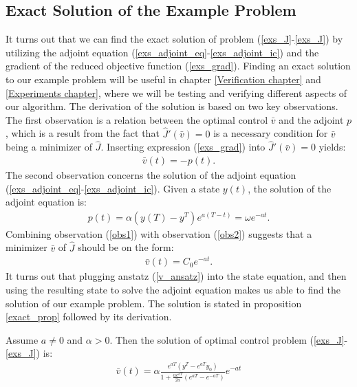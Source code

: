 \subsection{Exact Solution of the Example Problem} \label{exact_sec}
It turns out that we can find the exact solution of problem (\ref{exs_J}-\ref{exs_J}) by utilizing the adjoint equation (\ref{exs_adjoint_eq}-\ref{exs_adjoint_ic}) and the gradient of the reduced objective function (\ref{exs_grad}). Finding an exact solution to our example problem will be useful in chapter \ref{Verification chapter} and \ref{Experiments chapter}, where we will be testing and verifying different aspects of our algorithm. The derivation of the solution is based on two key observations. The first observation is a relation between the optimal control $\bar v$ and the adjoint $p$, which is a result from the fact that $\hat J'(\bar v)=0$ is a necessary condition for $\bar v$ being a minimizer of $\hat J$. Inserting expression (\ref{exs_grad}) into $\hat J'(\bar v)=0$ yields:
\begin{align}
\bar v(t)=-p(t). \label{obs1}
\end{align} 
The second observation concerns the solution of the adjoint equation (\ref{exs_adjoint_eq}-\ref{exs_adjoint_ic}). Given a state $y(t)$, the solution of the adjoint equation is:
\begin{align}
p(t) = \alpha(y(T)-y^T)e^{a(T-t)} = \omega e^{-at}. \label{obs2}
\end{align}
Combining observation (\ref{obs1}) with observation (\ref{obs2}) suggests that a minimizer $\bar v$ of $\hat J$ should be on the form:
\begin{align}
\bar v(t) = C_0 e^{-at}. \label{v_ansatz}
\end{align}
It turns out that plugging anstatz (\ref{v_ansatz}) into the state equation, and then using the resulting state to solve the adjoint equation makes us able to find the solution of our example problem. The solution is stated in proposition \ref{exact_prop} followed by its derivation.
\begin{proposition} \label{exact_prop}
Assume $a\neq0$ and $\alpha>0$. Then the solution of optimal control problem (\ref{exs_J}-\ref{exs_J}) is:
\begin{align}
\bar v(t) = \alpha\frac{e^{aT}(y^T-e^{aT}y_0)}{1+\frac{\alpha e^{aT}}{2a}(e^{aT}-e^{-aT})}e^{-at}
\end{align}
\end{proposition}
